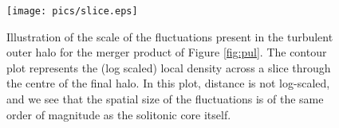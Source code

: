 \documentclass[a4paper,11pt]{article}
\newcommand{\re}[1]{{{\bf \color{green} RE: #1}}}
\begin{document}
\begin{figure}
\centering
\texttt{[image: pics/slice.eps]}
\caption{Illustration of the scale of the fluctuations present in the turbulent outer halo for the merger product of Figure \ref{fig:pul}. The contour plot represents the (log scaled) local density across a slice through the centre of the final halo. In this plot, distance is not log-scaled, and we see that the spatial size of the fluctuations is of the same order of magnitude as the solitonic core itself.}\label{fig:contour}
\end{figure}

\end{document}
